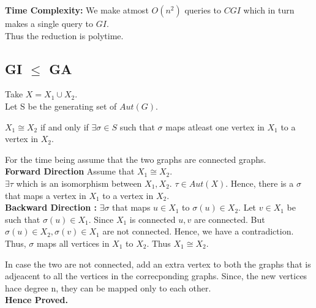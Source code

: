 \textbf{Time Complexity:} We make atmost $O(n^2)$ queries to $CGI$ which in turn makes a single query to $GI$.\\Thus the reduction is polytime.




\subsection{GI $\le$ GA}
Take $X = X_1 \cup X_2$.\\
Let S be the generating set of $Aut(G)$.
\begin{claim}
$X_1 \cong X_2$ if and only if $\exists \sigma \in S$ such that $\sigma$ maps atleast one vertex in $X_1$ to a vertex in $X_2$.
\end{claim}

For the time being assume that the two graphs are connected graphs.\\
\textbf{Forward Direction} Assume that $X_1 \cong X_2$.\\
	$\exists \tau$ which is an isomorphism between $X_1,X_2$. $\tau \in Aut(X)$. Hence, there is a $\sigma$ that maps a vertex in $X_1$ to a vertex in $X_2$.\\
\textbf{Backward Direction :} $\exists \sigma$ that maps $u \in X_1$ to $\sigma(u) \in X_2$. Let $v \in X_1$ be such that $\sigma(u) \in X_1$. Since $X_1$ is connected $u,v$ are connected. But $\sigma(u) \in X_2, \sigma(v) \in X_1$ are not connected. Hence, we have a contradiction. Thus, $\sigma$ maps all vertices in $X_1$ to $X_2$. Thus $X_1 \cong X_2$.

In case the two are not connected, add an extra vertex to both the graphs that is adjeacent to all the vertices in the correcponding graphs. Since, the new vertices hace degree n, they can be mapped only to each other.\\
\textbf{Hence Proved.}

